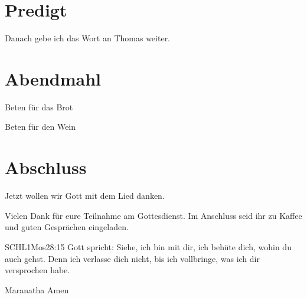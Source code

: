 \documentclass{../../inc/mybib}
\begin{document}
\section{Predigt}

Danach gebe ich das Wort an Thomas weiter.



\section{Abendmahl}

Beten für das Brot


Beten für den Wein


\section{Abschluss}

Jetzt wollen wir Gott mit dem Lied  danken.

Vielen Dank für eure Teilnahme am Gottesdienst. Im Anschluss seid ihr zu Kaffee und guten Gesprächen eingeladen.
\beten{}

\begin{bibelbox}{SCHL}{1Mos}{28:15}
Gott spricht: Siehe, ich bin mit dir,
ich behüte dich, wohin du auch gehst.
Denn ich verlasse dich nicht,
bis ich vollbringe, was ich dir versprochen habe.
\end{bibelbox}

Maranatha Amen
\end{document}
